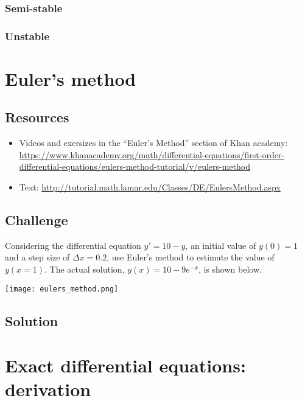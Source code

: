 \subsubsection*{Semi-stable}

\subsubsection*{Unstable}



\iffalse
\newpage
\section{Euler's method}

\subsection*{Resources}
\begin{itemize}
    \item Videos and exersizes in the ``Euler's Method'' section of Khan academy: \url{https://www.khanacademy.org/math/differential-equations/first-order-differential-equations/eulers-method-tutorial/v/eulers-method}
    \item Text: \url{http://tutorial.math.lamar.edu/Classes/DE/EulersMethod.aspx}
\end{itemize}

\subsection*{Challenge}
Considering the differential equation $y'=10-y$, an initial value of $y(0)=1$ and a step size of $\Delta x = 0.2$, use Euler's method to estimate the value of $y(x=1)$. The actual solution, $y(x)=10-9e^{-x}$, is shown below.

\texttt{[image: eulers\_method.png]}

\subsection*{Solution}
\six{}





\newpage
\section{Exact differential equations: derivation}


